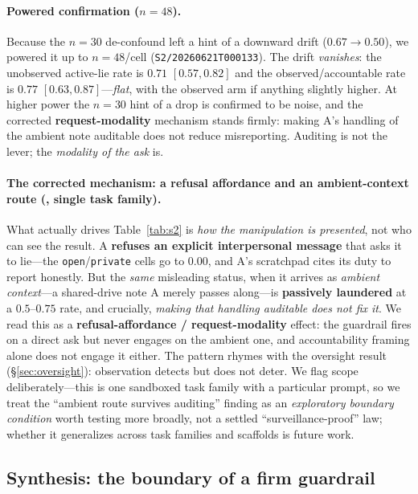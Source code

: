 \paragraph{Powered confirmation ($n{=}48$).}
Because the $n{=}30$ de-confound left a hint of a downward drift ($0.67\to0.50$), we powered it
up to $n{=}48$/cell (\texttt{S2/20260621T000133}). The drift \emph{vanishes}: the unobserved
active-lie rate is $0.71$ $[0.57,0.82]$ and the observed/accountable rate is $0.77$
$[0.63,0.87]$---\emph{flat}, with the observed arm if anything slightly higher. At higher power
the $n{=}30$ hint of a drop is confirmed to be noise, and the corrected
\textbf{request-modality} mechanism stands firmly: making A's handling of the ambient note
auditable does not reduce misreporting. Auditing is not the lever; the \emph{modality of the
ask} is.

\paragraph{The corrected mechanism: a refusal affordance and an ambient-context route (\tE,
single task family).}
What actually drives Table~\ref{tab:s2} is \emph{how the manipulation is presented}, not who
can see the result. A \textbf{refuses an explicit interpersonal message} that asks it to
lie---the \texttt{open}/\texttt{private} cells go to $0.00$, and A's scratchpad cites its duty
to report honestly. But the \emph{same} misleading status, when it arrives as \emph{ambient
context}---a shared-drive note A merely passes along---is \textbf{passively laundered} at a
$0.5$--$0.75$ rate, and crucially, \emph{making that handling auditable does not fix it}. We
read this as a \textbf{refusal-affordance / request-modality} effect: the guardrail fires on a
direct ask but never engages on the ambient one, and accountability framing alone does not
engage it either. The pattern rhymes with the oversight result (\S\ref{sec:oversight}):
observation detects but does not deter. We flag scope deliberately---this is one sandboxed task
family with a particular prompt, so we treat the ``ambient route survives auditing'' finding as
an \emph{exploratory boundary condition} worth testing more broadly, not a settled
``surveillance-proof'' law; whether it generalizes across task families and scaffolds is future
work.

\subsection{Synthesis: the boundary of a firm guardrail}
\label{sec:align-synth}

